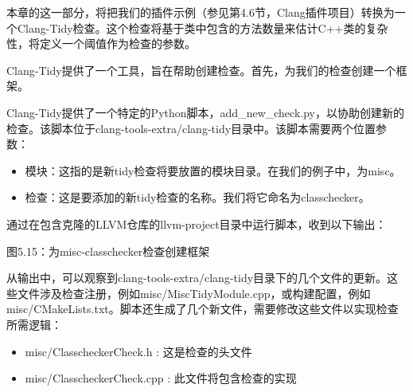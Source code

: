 
本章的这一部分，将把我们的插件示例（参见第4.6节，Clang插件项目）转换为一个Clang-Tidy检查。这个检查将基于类中包含的方法数量来估计C++类的复杂性，将定义一个阈值作为检查的参数。

Clang-Tidy提供了一个工具，旨在帮助创建检查。首先，为我们的检查创建一个框架。


Clang-Tidy提供了一个特定的Python脚本，add\_new\_check.py，以协助创建新的检查。该脚本位于clang-tools-extra/clang-tidy目录中。该脚本需要两个位置参数：

\begin{itemize}
\item
模块：这指的是新tidy检查将要放置的模块目录。在我们的例子中，为misc。

\item
检查：这是要添加的新tidy检查的名称。我们将它命名为classchecker。
\end{itemize}

通过在包含克隆的LLVM仓库的llvm-project目录中运行脚本，收到以下输出：


\begin{center}
图5.15：为misc-classchecker检查创建框架
\end{center}

从输出中，可以观察到clang-tools-extra/clang-tidy目录下的几个文件的更新。这些文件涉及检查注册，例如misc/MiscTidyModule.cpp，或构建配置，例如misc/CMakeLists.txt。脚本还生成了几个新文件，需要修改这些文件以实现检查所需逻辑：

\begin{itemize}
\item
misc/ClasscheckerCheck.h : 这是检查的头文件

\item
misc/ClasscheckerCheck.cpp : 此文件将包含检查的实现
\end{itemize}

